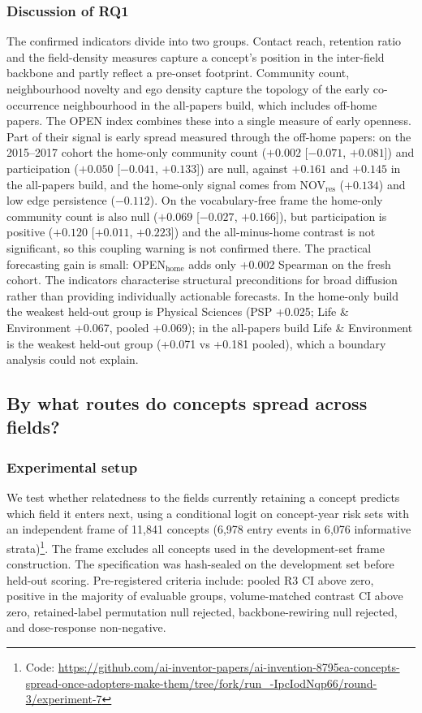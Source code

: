 \documentclass[11pt,letterpaper]{article}
\begin{document}
\subsubsection{Discussion of RQ1}

The confirmed indicators divide into two groups. Contact reach, retention ratio and the field-density measures capture a concept's position in the inter-field backbone and partly reflect a pre-onset footprint. Community count, neighbourhood novelty and ego density capture the topology of the early co-occurrence neighbourhood in the all-papers build, which includes off-home papers. The OPEN index combines these into a single measure of early openness. Part of their signal is early spread measured through the off-home papers: on the 2015--2017 cohort the home-only community count ($+0.002$ [$-0.071$, $+0.081$]) and participation ($+0.050$ [$-0.041$, $+0.133$]) are null, against $+0.161$ and $+0.145$ in the all-papers build, and the home-only signal comes from NOV$_{\text{res}}$ ($+0.134$) and low edge persistence ($-0.112$). On the vocabulary-free frame the home-only community count is also null ($+0.069$ [$-0.027$, $+0.166$]), but participation is positive ($+0.120$ [$+0.011$, $+0.223$]) and the all-minus-home contrast is not significant, so this coupling warning is not confirmed there. The practical forecasting gain is small: OPEN$_{\text{home}}$ adds only +0.002 Spearman on the fresh cohort. The indicators characterise structural preconditions for broad diffusion rather than providing individually actionable forecasts. In the home-only build the weakest held-out group is Physical Sciences (PSP +0.025; Life \& Environment +0.067, pooled +0.069); in the all-papers build Life \& Environment is the weakest held-out group (+0.071 vs +0.181 pooled), which a boundary analysis could not explain.


\subsection{By what routes do concepts spread across fields?}

\label{subsec:rq2_entry}
\subsubsection{Experimental setup}

We test whether relatedness to the fields currently retaining a concept predicts which field it enters next, using a conditional logit on concept-year risk sets with an independent frame of 11{,}841 concepts (6{,}978 entry events in 6{,}076 informative strata)\footnote{Code: \url{https://github.com/ai-inventor-papers/ai-invention-8795ea-concepts-spread-once-adopters-make-them/tree/fork/run_-IpcIodNqp66/round-3/experiment-7}}. The frame excludes all concepts used in the development-set frame construction. The specification was hash-sealed on the development set before held-out scoring. Pre-registered criteria include: pooled R3 CI above zero, positive in the majority of evaluable groups, volume-matched contrast CI above zero, retained-label permutation null rejected, backbone-rewiring null rejected, and dose-response non-negative.
\end{document}

